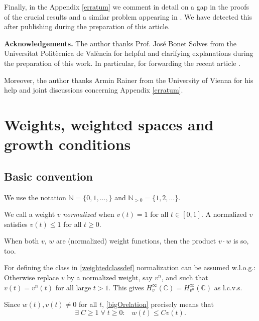 \documentclass[10pt]{amsart}%
\numberwithin{equation}{section}
\theoremstyle{plain}
\newcommand{\CC}{\mathbb{C}}
\newcommand{\NN}{\mathbb{N}}
\begin{document}
Finally, in the Appendix \ref{erratum} we comment in detail on a gap in the proofs of the crucial results \cite[Prop. 4.7 \& 4.12]{weightedentirecharacterization} and a similar problem appearing in \cite[Prop. 4.7]{Borelmapalgebraity}. We have detected this after publishing \cite{weightedentirecharacterization} during the preparation of this article.\vspace{6pt}

\textbf{Acknowledgements.} The author thanks Prof. Jos\'{e} Bonet Solves from the Universitat Polit\`{e}cnica de Val\`{e}ncia for helpful and clarifying explanations during the preparation of this work. In particular, for forwarding the recent article \cite{Bonet2022survey}.

Moreover, the author thanks Armin Rainer from the University of Vienna for his help and joint discussions concerning Appendix \ref{erratum}.

\section{Weights, weighted spaces and growth conditions}\label{weightsection}

\subsection{Basic convention}
We use the notation $\NN=\{0,1,\dots,\}$ and $\NN_{>0}=\{1,2,\dots\}$.\vspace{6pt}

We call a weight $v$ {\itshape normalized} when $v(t)=1$ for all $t\in[0,1]$. A normalized $v$ satisfies $v(t)\le 1$ for all $t\ge 0$.

When both $v$, $w$ are (normalized) weight functions, then the product $v\cdot w$ is so, too.

For defining the class in \eqref{weightedclassdef} normalization can be assumed w.l.o.g.: Otherwise replace $v$ by a normalized weight, say $v^n$, and such that $v(t)=v^n(t)$ for all large $t>1$. This gives $H^{\infty}_v(\CC)=H^{\infty}_{v^n}(\CC)$ as l.c.v.s.

Since $w(t),v(t)\neq 0$ for all $t$, \eqref{bigOrelation} precisely means that
$$\exists\;C\ge 1\;\forall\;t\ge 0:\;\;\;w(t)\le Cv(t).$$
\end{document}

